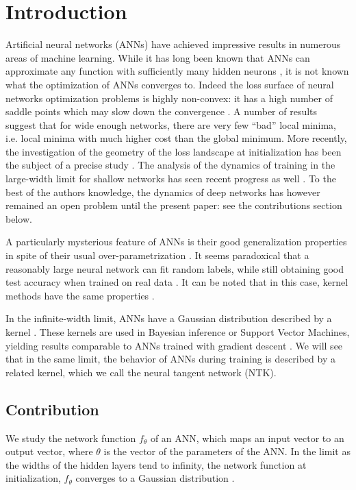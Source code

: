 \section{Introduction}
Artificial neural networks (ANNs) have achieved impressive results in numerous areas of machine learning. While it has long been known that ANNs can approximate any function with sufficiently many hidden neurons \cite{Hornik1989, Leshno}, it is not known what the optimization of ANNs converges to. Indeed the loss surface of neural networks optimization problems is highly non-convex: it has a high number of saddle points which may slow down the convergence \citep{Dauphin2014}. A number of results \citep{Choromanska, Pascanu2014, Pennington2017} suggest that for wide enough networks, there are very few ``bad'' local minima, i.e. local minima with much higher cost than the global minimum. More recently, the investigation of the geometry of the loss landscape at initialization has been the subject of a precise study \citep{Karakida2018}. The analysis of the dynamics of training in the large-width limit for shallow networks has seen recent progress as well \citep{Mei2018}. To the best of the authors knowledge, the dynamics of deep networks has however remained an open problem until the present paper: see the contributions section below.

A particularly mysterious feature of ANNs is their good generalization properties in spite of their usual over-parametrization \citep{Sagun}. It seems paradoxical that a reasonably large neural network can fit random labels, while still obtaining good test accuracy when trained on real data \citep{Zhang}. It can be noted that in this case, kernel methods have the same properties \citep{Belkin}.

In the infinite-width limit, ANNs have a Gaussian distribution described by a kernel \cite{Neal1996,Daniely, Matthews2017GaussianProcess,Lee2017,Matthews2018GaussianProcess}. These kernels are used in Bayesian inference or Support Vector Machines, yielding results comparable to ANNs trained with gradient descent \cite{Cho2009, Lee2017}. We will see that in the same limit, the behavior of ANNs during training is described by a related kernel, which we call the neural tangent network (NTK).

\subsection{Contribution}
We study the network function $f_\theta$ of an ANN, which maps an input vector to an output vector, where $\theta$ is the vector of the parameters of the ANN. In the limit as the widths of the hidden layers tend to infinity, the network function at initialization, $f_\theta$ converges to a Gaussian distribution \cite{Neal1996,Daniely, Matthews2017GaussianProcess,Lee2017,Matthews2018GaussianProcess}.

